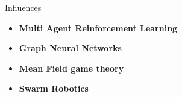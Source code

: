 \begin{frame}{\playfairblack Influences}
  \begin{card}
    \begin{itemize}
      \item \textbf{Multi Agent Reinforcement Learning}
      \item \textbf{Graph Neural Networks}
      \item \textbf{Mean Field game theory}
      \item \textbf{Swarm Robotics}
    \end{itemize}
  \end{card}
\end{frame}